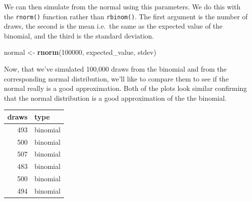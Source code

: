 \documentclass[]{article}
\newenvironment{Shaded}{\begin{snugshade}}{\end{snugshade}}
\newcommand{\DataTypeTok}[1]{\textcolor[rgb]{0.13,0.29,0.53}{#1}}
\newcommand{\DecValTok}[1]{\textcolor[rgb]{0.00,0.00,0.81}{#1}}
\newcommand{\FloatTok}[1]{\textcolor[rgb]{0.00,0.00,0.81}{#1}}
\newcommand{\KeywordTok}[1]{\textcolor[rgb]{0.13,0.29,0.53}{\textbf{#1}}}
\newcommand{\NormalTok}[1]{#1}
\newcommand{\OperatorTok}[1]{\textcolor[rgb]{0.81,0.36,0.00}{\textbf{#1}}}
\newcommand{\StringTok}[1]{\textcolor[rgb]{0.31,0.60,0.02}{#1}}
\begin{document}
We can then simulate from the normal using this parameters. We do this
with the \texttt{rnorm()} function rather than \texttt{rbinom()}. The
first argument is the number of draws, the second is the mean i.e.~the
same as the expected value of the binomial, and the third is the
standard deviation.

\begin{Shaded}
\begin{Highlighting}[]
\NormalTok{normal <-}\StringTok{ }\KeywordTok{rnorm}\NormalTok{(}\DecValTok{100000}\NormalTok{, expected_value, stdev)}
\end{Highlighting}
\end{Shaded}

Now, that we've simulated 100,000 draws from the binomial and from the
corresponding normal distribution, we'll like to compare them to see if
the normal really is a good approximation. Both of the plots look
similar confirming that the normal distribution is a good approximation
of the the binomial.

\begin{Shaded}
\end{Shaded}

\begin{longtable}[]{@{}rl@{}}
\toprule
draws & type\tabularnewline
\midrule
\endhead
493 & binomial\tabularnewline
500 & binomial\tabularnewline
507 & binomial\tabularnewline
483 & binomial\tabularnewline
500 & binomial\tabularnewline
494 & binomial\tabularnewline
\bottomrule
\end{longtable}

\begin{Shaded}
\end{Shaded}
\end{document}
